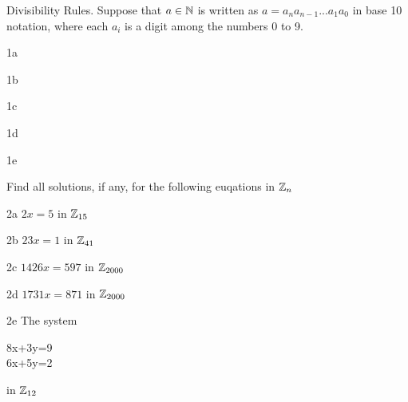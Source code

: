 \begin{question}{1}
Divisibility Rules. Suppose that $a \in \mathbb{N}$ is written as $a = a_na_{n-1}...a_1a_0$ in base 10 notation, where each $a_{i}$ is a digit among the numbers 0 to 9.
\end{question}


\begin{question}{1a}
\end{question}

\begin{question}{1b}
\end{question}

\begin{question}{1c}
\end{question}

\begin{question}{1d}
\end{question}

\begin{question}{1e}
\end{question}



\begin{question}{2}
Find all solutions, if any, for the following euqations in $\mathbb{Z}_n$
\end{question}


\begin{question}{2a}
$2x = 5$ in $\mathbb{Z}_{15}$
\end{question}

\begin{question}{2b}
$23x = 1$ in $\mathbb{Z}_{41}$
\end{question}

\begin{question}{2c}
$1426x = 597$ in $\mathbb{Z}_{2000}$
\end{question}

\begin{question}{2d}
$1731x = 871$ in $\mathbb{Z}_{2000}$
\end{question}

\begin{question}{2e}
The system \begin{tabular}[l]
8x+3y=9\\
6x+5y=2
\end{tabular} in $\mathbb{Z}_{12}$
\end{question}

